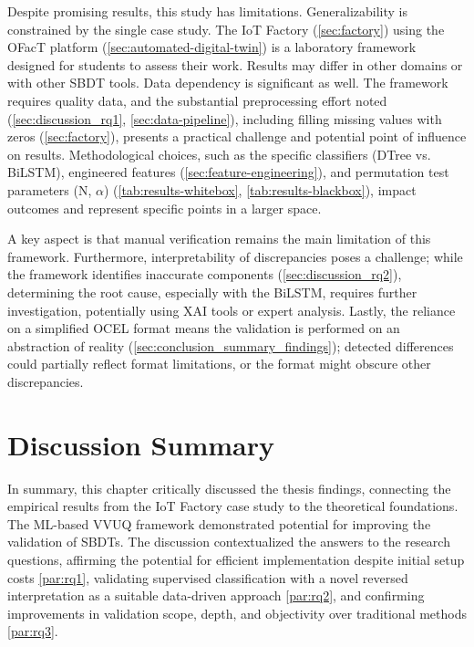 Despite promising results, this study has limitations. Generalizability is constrained by the single case study. The IoT Factory (\autoref{sec:factory}) using the OFacT platform (\autoref{sec:automated-digital-twin}) is a laboratory framework designed for students to assess their work. Results may differ in other domains or with other SBDT tools. Data dependency is significant as well. The framework requires quality data, and the substantial preprocessing effort noted (\autoref{sec:discussion_rq1}, \autoref{sec:data-pipeline}), including filling missing values with zeros (\autoref{sec:factory}), presents a practical challenge and potential point of influence on results. Methodological choices, such as the specific classifiers (DTree vs. BiLSTM), engineered features (\autoref{sec:feature-engineering}), and permutation test parameters (N, $\alpha$) (\autoref{tab:results-whitebox}, \autoref{tab:results-blackbox}), impact outcomes and represent specific points in a larger space.

A key aspect is that manual verification remains the main limitation of this framework. Furthermore, interpretability of discrepancies poses a challenge; while the framework identifies inaccurate components (\autoref{sec:discussion_rq2}), determining the root cause, especially with the BiLSTM, requires further investigation, potentially using XAI tools or expert analysis. Lastly, the reliance on a simplified OCEL format means the validation is performed on an abstraction of reality (\autoref{sec:conclusion_summary_findings}); detected differences could partially reflect format limitations, or the format might obscure other discrepancies.

\section{Discussion Summary}
\label{sec:discussion_summary}

In summary, this chapter critically discussed the thesis findings, connecting the empirical results from the IoT Factory case study to the theoretical foundations. The ML-based VVUQ framework demonstrated potential for improving the validation of SBDTs. The discussion contextualized the answers to the research questions, affirming the potential for efficient implementation despite initial setup costs \autoref{par:rq1}, validating supervised classification with a novel reversed interpretation as a suitable data-driven approach \autoref{par:rq2}, and confirming improvements in validation scope, depth, and objectivity over traditional methods \autoref{par:rq3}.